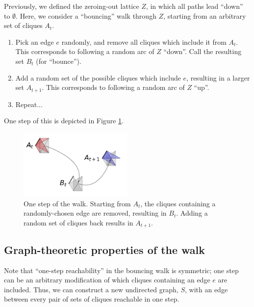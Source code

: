\documentclass[12pt]{article}
\theoremstyle{definition}
\begin{document}
Previously, we defined the zeroing-out lattice $Z$, in which all paths lead
``down'' to $\emptyset$. Here, we consider a ``bouncing'' walk
through $Z$, starting from an arbitrary set of cliques $A_t$.

\begin{enumerate}

\item Pick an edge $e$ randomly, and remove all cliques which include it from $A_t$. 
This corresponds to
following a random arc of $Z$ ``down''. Call the resulting set $B_t$ (for ``bounce'').

\item Add a random set of the possible cliques which include $e$,
resulting in a larger set $A_{t+1}$. This corresponds to following
a random arc of $Z$ ``up''.

\item Repeat...

\end{enumerate}

One step of this is depicted in Figure \ref{fig:boing}.

\begin{figure}

\centering

\includegraphics[width=0.5\textwidth]{bounce.pdf}

\caption{
One step of the walk. Starting from $A_t$, the cliques containing 
a randomly-chosen edge are removed, resulting in $B_t$.
Adding a random set of cliques back results in $A_{t+1}$.
}
\label{fig:boing}

\end{figure}

\subsection{Graph-theoretic properties of the walk}
Note that ``one-step reachability'' in the bouncing walk is symmetric;
one step can be an arbitrary modification of which cliques containing 
an edge $e$ are included.
Thus, we can construct a new undirected graph, $S$, with an edge between every
pair of sets of cliques reachable in one step.
\end{document}
